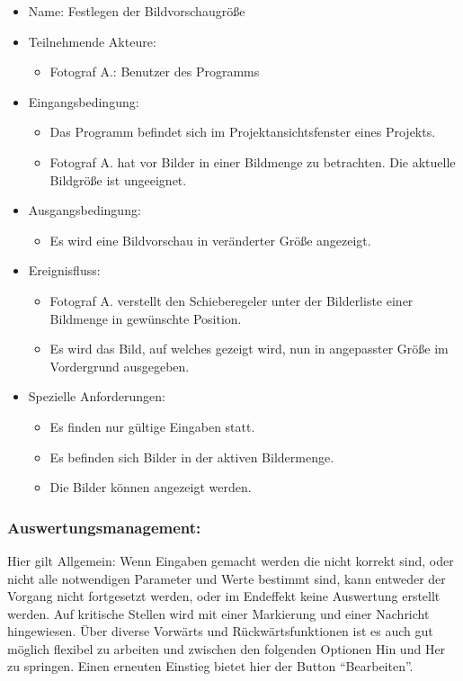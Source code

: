	\begin{itemize}
		\item Name: Festlegen der Bildvorschaugröße
		\item Teilnehmende Akteure:
		\begin{itemize}
			\item	Fotograf A.: Benutzer des Programms		
		\end{itemize}
		\item Eingangsbedingung:
		\begin{itemize}
			\item	Das Programm befindet sich im Projektansichtsfenster eines Projekts.
			\item Fotograf A. hat vor Bilder in einer Bildmenge zu betrachten. Die aktuelle Bildgröße ist ungeeignet.
		\end{itemize}
		\item Ausgangsbedingung:
		\begin{itemize}
			\item	Es wird eine Bildvorschau in veränderter Größe angezeigt.	
		\end{itemize}
		\item Ereignisfluss:
		\begin{itemize}
			\item Fotograf A. verstellt den Schieberegeler unter der Bilderliste einer Bildmenge in gewünschte Position.
			\item Es wird das Bild, auf welches gezeigt wird, nun in angepasster Größe im Vordergrund ausgegeben.
		\end{itemize}
		\item Spezielle Anforderungen:
		\begin{itemize}
			\item	Es finden nur gültige Eingaben statt.
			\item Es befinden sich Bilder in der aktiven Bildermenge.
			\item Die Bilder können angezeigt werden.			
		\end{itemize}			
	\end{itemize}
	
	\subsubsection{Auswertungsmanagement:}
	Hier gilt Allgemein: Wenn Eingaben gemacht werden die nicht korrekt sind, oder nicht alle notwendigen Parameter und Werte bestimmt sind, kann entweder der Vorgang nicht fortgesetzt werden, oder im Endeffekt keine Auswertung erstellt werden. Auf kritische Stellen wird mit einer Markierung und einer Nachricht hingewiesen. Über diverse Vorwärts und Rückwärtsfunktionen ist es auch gut möglich flexibel zu arbeiten und zwischen den folgenden Optionen Hin und Her zu springen. Einen erneuten Einstieg bietet hier der Button "`Bearbeiten"'.
	
